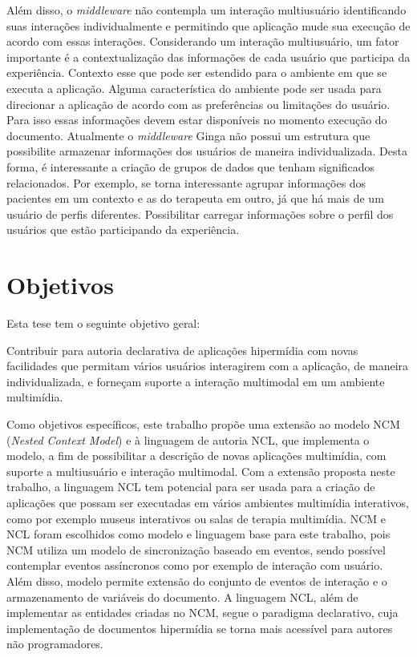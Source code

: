 Além disso, o \textit{middleware} não contempla um interação multiusuário identificando suas interações individualmente e permitindo que aplicação mude sua execução de acordo com essas interações. Considerando um interação multiusuário, um fator importante é a contextualização das informações de cada usuário que participa da experiência. Contexto esse que pode ser estendido para o ambiente em que se executa a aplicação. Alguma característica do ambiente pode ser usada para direcionar a aplicação de acordo com as preferências ou limitações do usuário. Para isso essas informações devem estar disponíveis no momento execução do documento. Atualmente o \textit{middleware} Ginga não possui um estrutura que possibilite armazenar informações dos usuários de maneira individualizada. Desta forma, é interessante a criação de grupos de dados que tenham significados relacionados. Por exemplo, se torna interessante agrupar informações dos pacientes em um contexto e as do terapeuta em outro, já que há mais de um usuário de perfis diferentes. Possibilitar carregar informações sobre o perfil dos usuários que estão participando da experiência.


\section{Objetivos}
\label{sec:objetivos}

Esta tese tem o seguinte objetivo geral:

Contribuir para autoria declarativa de aplicações hipermídia com novas facilidades que permitam vários usuários interagirem com a aplicação, de maneira individualizada, e forneçam suporte a interação multimodal em um ambiente multimídia.

Como objetivos específicos, este trabalho propõe uma extensão ao modelo NCM (\textit{Nested Context Model}) \cite{Soares:2005qy} e à linguagem de autoria NCL, que implementa o modelo, a fim de possibilitar a descrição de novas aplicações multimídia, com suporte a multiusuário e interação multimodal. Com a extensão proposta neste trabalho, a linguagem NCL tem potencial para ser usada para a criação de aplicações que possam ser executadas em vários ambientes multimídia interativos, como por exemplo museus interativos ou salas de terapia multimídia. NCM e NCL foram escolhidos como modelo e linguagem base para este trabalho, pois NCM utiliza um modelo de sincronização baseado em eventos, sendo possível contemplar eventos assíncronos como por exemplo de interação com usuário. Além disso, modelo permite extensão do conjunto de eventos de interação e o armazenamento de variáveis do documento. A linguagem NCL, além de implementar as entidades criadas no NCM, segue o paradigma declarativo, cuja implementação de documentos hipermídia se torna mais acessível para autores não programadores. 

